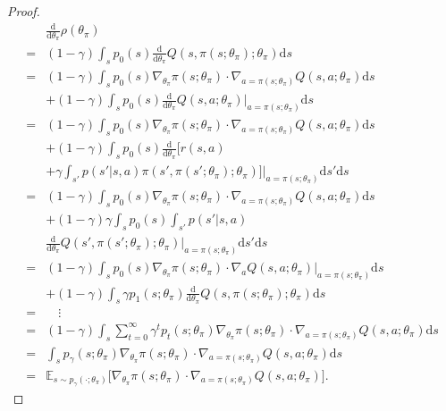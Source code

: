 \begin{proof}
    \begin{align*}
        &\frac{\mathrm{d}}{\mathrm{d}\theta_\pi} \rho(\theta_\pi)\\
        =& (1 - \gamma)\int_{s} p_0(s) \frac{\mathrm{d}}{\mathrm{d}\theta_\pi} Q(s, \pi(s; \theta_\pi); \theta_\pi) \mathrm{d}s \\
        =& (1 - \gamma)\int_{s} p_0(s) \nabla_{\theta_\pi} \pi(s; \theta_\pi)\cdot \nabla_{a = \pi(s;\theta_\pi)} Q(s, a; \theta_\pi)\mathrm{d}s\\
            &+ (1 - \gamma)\int_{s} p_0(s) \frac{\mathrm{d}}{\mathrm{d}\theta_\pi} Q(s, a; \theta_\pi) \big\vert_{a = \pi(s;\theta_\pi)} \mathrm{d} s \\
        =& (1 - \gamma)\int_{s} p_0(s) \nabla_{\theta_\pi} \pi(s; \theta_\pi)\cdot \nabla_{a = \pi(s; \theta_\pi)} Q(s, a; \theta_\pi) \mathrm{d}s\\
            &+ (1 - \gamma) \int_{s} p_0(s) \frac{\mathrm{d}}{\mathrm{d}\theta_\pi} 
            \bigg[r(s, a) \\
            & + \gamma \int_{s'} p(s' \vert s, a)\pi(s',\pi(s';\theta_\pi); \theta_\pi)\bigg]
            \bigg\vert_{a=\pi(s;\theta_\pi)} \mathrm{d} s' \mathrm{d} s\\
        =& (1 - \gamma)\int_{s} p_0(s) \nabla_{\theta_\pi} \pi(s; \theta_\pi)\cdot \nabla_{a=\pi(s;\theta_\pi)} Q(s, a; \theta_\pi)\mathrm{d}s\\
            &+ (1 - \gamma)\gamma\int_{s} p_0(s) \int_{s'}p(s'\vert s, a) \\
            & \frac{\mathrm{d}}{\mathrm{d}\theta_\pi} 
            Q(s',\pi(s';\theta_\pi); \theta_\pi)
            \bigg\vert_{a=\pi(s;\theta_\pi)} \mathrm{d} s' \mathrm{d} s\\
        =& (1 - \gamma) \int_{s} p_0(s) \nabla_{\theta_\pi} \pi(s; \theta_\pi)\cdot \nabla_a Q(s, a; \theta_\pi)\big\vert_{a=\pi(s;\theta_\pi)}\mathrm{d} s\\
            &+ (1 - \gamma)\int_{s} \gamma p_1(s;\theta_\pi)\frac{\mathrm{d}}{\mathrm{d}\theta_\pi} 
            Q(s,\pi(s;\theta_\pi); \theta_\pi) \mathrm{d} s\\
        =& \quad \vdots \\
        =& (1 - \gamma) \int_{s} \sum^{\infty}_{t=0}\gamma^t p_t(s;\theta_\pi)
            \nabla_{\theta_\pi} \pi(s; \theta_\pi)
            \cdot \nabla_{a = \pi(s;\theta_\pi)} Q(s, a; \theta_\pi)\mathrm{d} s\\
        =& \int_{s} p_{\gamma}(s;\theta_\pi) 
            \nabla_{\theta_\pi} \pi(s; \theta_\pi)
            \cdot \nabla_{a=\pi(s;\theta_\pi)} Q(s, a; \theta_\pi) \mathrm{d}s\\
        =& \mathbb{E}_{s \sim p_{\gamma}(\cdot;\theta_\pi)}
            \bigg[\nabla_{\theta_\pi} \pi(s; \theta_\pi) \cdot \nabla_{a = \pi(s; \theta_\pi)} Q(s, a; \theta_\pi)\bigg].
    \end{align*}
\end{proof}

